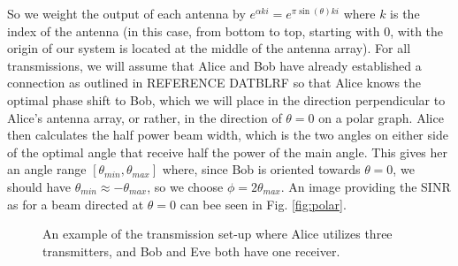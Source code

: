 \documentclass[letterpaper, 10 pt, conference]{ieeetran}  %
\theoremstyle{definition}
\theoremstyle{theorem}
\begin{document}
So we weight the output of each antenna by $e^{\alpha k i} = e^{\pi \sin(\theta) k i}$ where $k$ is the index of the antenna (in this case, from bottom to top, starting with $0$, with the origin of our system is located at the middle of the antenna array).  
For all transmissions, we will assume that Alice and Bob have already established a connection as outlined in REFERENCE DATBLRF so that Alice knows the optimal phase shift to Bob, which we will place in the direction perpendicular to Alice's antenna array, or rather, in the direction of $\theta = 0$ on a polar graph.  
Alice then calculates the half power beam width, which is the two angles on either side of the optimal angle that receive half the power of the main angle.  
This gives her an angle range $[\theta_{min},\theta_{max}]$ where, since Bob is oriented towards $\theta = 0$, we should have $\theta_{min} \approx -\theta_{max}$, so we choose $\phi = 2\theta_{max}$.
An image providing the \ac{SINR} as for a beam directed at $\theta = 0$ can bee seen in Fig. \ref{fig:polar}.

\begin{figure}
\centering
{}
\caption{An example of the transmission set-up where Alice utilizes three transmitters, and Bob and Eve both have one receiver.}
\label{fig:Sig}
\end{figure}
\end{document}
